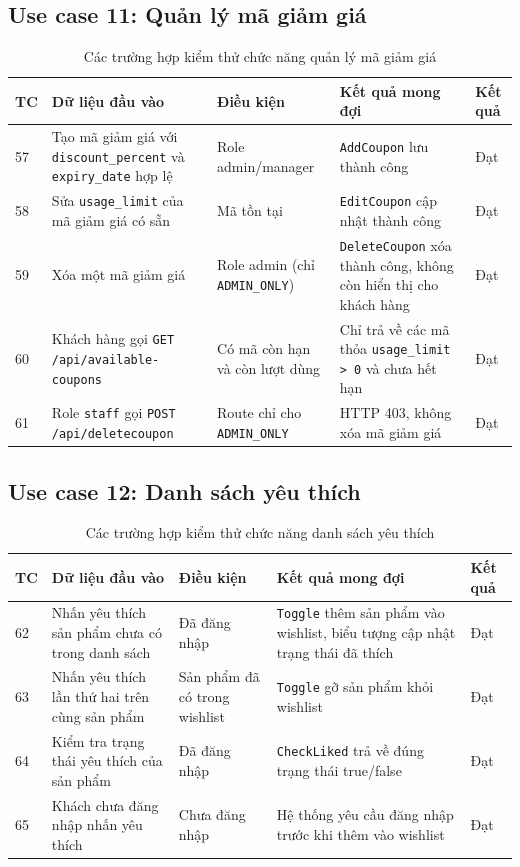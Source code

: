 \documentclass[../DoAn.tex]{subfiles}
\begin{document}
\subsection*{Use case 11: Quản lý mã giảm giá}

\begin{table}[H]
\centering
\caption{Các trường hợp kiểm thử chức năng quản lý mã giảm giá}
\label{tab:test-coupon}
\scriptsize
\begin{tabular}{|p{0.5cm}|p{4.5cm}|p{3cm}|p{3.5cm}|p{1cm}|}
\hline
\textbf{TC} & \textbf{Dữ liệu đầu vào} & \textbf{Điều kiện} & \textbf{Kết quả mong đợi} & \textbf{Kết quả} \\
\hline
57 & Tạo mã giảm giá với \break \texttt{discount\_percent} và \break \texttt{expiry\_date} hợp lệ & Role admin/manager & \texttt{AddCoupon} lưu thành công & Đạt \\
\hline
58 & Sửa \texttt{usage\_limit} của mã giảm giá có sẵn & Mã tồn tại & \texttt{EditCoupon} cập nhật thành công & Đạt \\
\hline
59 & Xóa một mã giảm giá & Role admin \break (chỉ \texttt{ADMIN\_ONLY}) & \texttt{DeleteCoupon} xóa thành công, không còn hiển thị cho khách hàng & Đạt \\
\hline
60 & Khách hàng gọi \texttt{GET /api/available-coupons} & Có mã còn hạn và còn lượt dùng & Chỉ trả về các mã thỏa \break \texttt{usage\_limit > 0} và chưa hết hạn & Đạt \\
\hline
61 & Role \texttt{staff} gọi \texttt{POST /api/deletecoupon} & Route chỉ cho \break \texttt{ADMIN\_ONLY} & HTTP 403, không xóa mã giảm giá & Đạt \\
\hline
\end{tabular}
\end{table}

\subsection*{Use case 12: Danh sách yêu thích}

\begin{table}[H]
\centering
\caption{Các trường hợp kiểm thử chức năng danh sách yêu thích}
\label{tab:test-wishlist}
\scriptsize
\begin{tabular}{|p{0.5cm}|p{3.5cm}|p{3cm}|p{3.5cm}|p{2cm}|}
\hline
\textbf{TC} & \textbf{Dữ liệu đầu vào} & \textbf{Điều kiện} & \textbf{Kết quả mong đợi} & \textbf{Kết quả} \\
\hline
62 & Nhấn yêu thích sản phẩm chưa có trong danh sách & Đã đăng nhập & \texttt{Toggle} thêm sản phẩm vào wishlist, biểu tượng cập nhật trạng thái đã thích & Đạt \\
\hline
63 & Nhấn yêu thích lần thứ hai trên cùng sản phẩm & Sản phẩm đã có trong wishlist & \texttt{Toggle} gỡ sản phẩm khỏi wishlist & Đạt \\
\hline
64 & Kiểm tra trạng thái yêu thích của sản phẩm & Đã đăng nhập & \texttt{CheckLiked} trả về đúng trạng thái true/false & Đạt \\
\hline
65 & Khách chưa đăng nhập nhấn yêu thích & Chưa đăng nhập & Hệ thống yêu cầu đăng nhập trước khi thêm vào wishlist & Đạt \\
\hline
\end{tabular}
\end{table}
\end{document}
